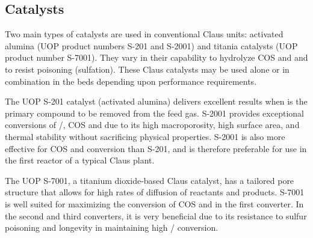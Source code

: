 \subsection{Catalysts}

Two main types of catalysts are used in conventional Claus units: activated alumina (UOP product numbers S-201 and S-2001) and titania catalysts (UOP product number S-7001). They vary in their capability to hydrolyze COS and  and to resist poisoning (sulfation). These Claus catalysts may be used alone or in combination in the beds depending upon performance requirements.

The UOP S-201 catalyst (activated alumina) delivers excellent results when  is the primary compound to be removed from the feed gas. S-2001 provides exceptional conversions of /, COS and  due to its high macroporosity, high surface area, and thermal stability without sacrificing physical properties. S-2001 is also more effective for COS and  conversion than S-201, and is therefore preferable for use in the first reactor of a typical Claus plant.

The UOP S-7001, a titanium dioxide-based Claus catalyst, has a tailored pore structure that allows for high rates of diffusion of reactants and products. S-7001 is well suited for maximizing the conversion of COS and  in the first converter. In the second and third converters, it is very beneficial due to its resistance to sulfur poisoning and longevity in maintaining high / conversion.

